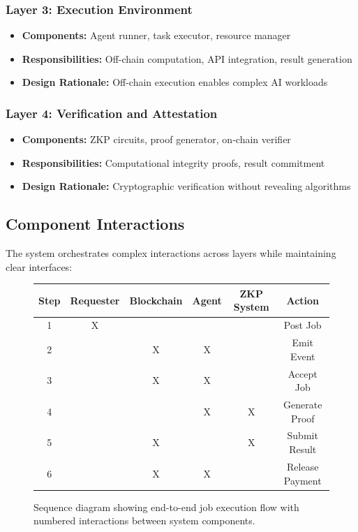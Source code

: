 \subsubsection{Layer 3: Execution Environment}
\begin{itemize}
    \item \textbf{Components:} Agent runner, task executor, resource manager
    \item \textbf{Responsibilities:} Off-chain computation, API integration, result generation
    \item \textbf{Design Rationale:} Off-chain execution enables complex AI workloads
\end{itemize}

\subsubsection{Layer 4: Verification and Attestation}
\begin{itemize}
    \item \textbf{Components:} ZKP circuits, proof generator, on-chain verifier
    \item \textbf{Responsibilities:} Computational integrity proofs, result commitment
    \item \textbf{Design Rationale:} Cryptographic verification without revealing algorithms
\end{itemize}

\subsection{Component Interactions}

The system orchestrates complex interactions across layers while maintaining clear interfaces:

\begin{figure}[h]
    \centering
    \begin{tabular}{|c|c|c|c|c|c|}
    \hline
    \textbf{Step} & \textbf{Requester} & \textbf{Blockchain} & \textbf{Agent} & \textbf{ZKP System} & \textbf{Action} \\
    \hline
         1 & X & & & & Post Job \\
     2 & & X & X & & Emit Event \\
     3 & & X & X & & Accept Job \\
     4 & & & X & X & Generate Proof \\
     5 & & X & & X & Submit Result \\
     6 & & X & X & & Release Payment \\
    \hline
    \end{tabular}
    \caption{Sequence diagram showing end-to-end job execution flow with numbered interactions between system components.}
    \label{fig:sequence-diagram}
\end{figure}

